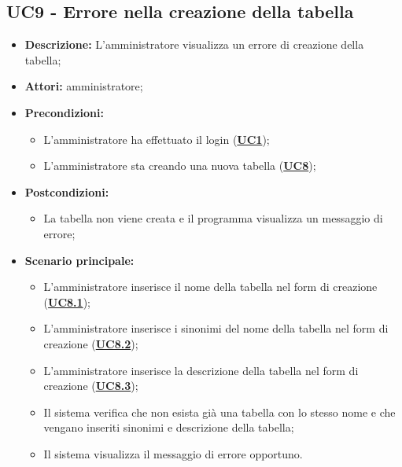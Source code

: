 \documentclass[5pt]{article}
\begin{document}
\subsection{UC9 - Errore nella creazione della tabella}
\label{sec:UC9}
\begin{itemize}
	\item \textbf{Descrizione:} L’amministratore visualizza un errore di creazione della tabella;
	\item \textbf{Attori:} amministratore;
	\item \textbf{Precondizioni:} 
	\begin{itemize}
		\item L’amministratore ha effettuato il login (\hyperref[sec:UC1]{\textbf{UC1}});
		\item L’amministratore sta creando una nuova tabella (\hyperref[sec:UC1]{\textbf{UC8}});
	\end{itemize}
	\item \textbf{Postcondizioni:} 
	\begin{itemize}
		\item La tabella non viene creata e il programma visualizza un messaggio di errore;
	\end{itemize}
	\item \textbf{Scenario principale:} 
	\begin{itemize}
		\item L’amministratore inserisce il nome della tabella nel form di creazione (\hyperref[sec:UC8.1]{\textbf{UC8.1}});
		\item L’amministratore inserisce i sinonimi del nome della tabella nel form di creazione (\hyperref[sec:UC8.2]{\textbf{UC8.2}});
		\item L’amministratore inserisce la descrizione della tabella nel form di creazione (\hyperref[sec:UC8.3]{\textbf{UC8.3}});
		\item Il sistema verifica che non esista già una tabella con lo stesso nome e che vengano inseriti sinonimi e descrizione della tabella;
		\item Il sistema visualizza il messaggio di errore opportuno.
	\end{itemize}
\end{itemize}
\end{document}

